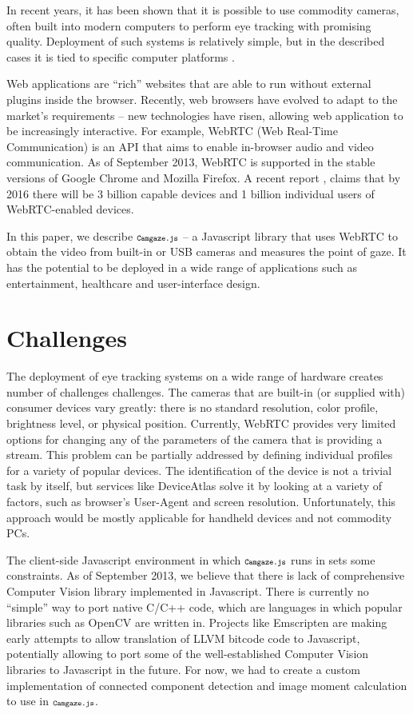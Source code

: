 \documentclass[annual]{acmsiggraph}
\newcommand{\Acronym}[1]{\ensuremath{{\small{\texttt{#1}}}}}
\newcommand{\Name}{\Acronym{Camgaze.js}} \newcommand{\False}{\Constant{false}}
\newcommand{\Constant}[1]{\ensuremath{\small{\texttt{#1}}}}
\begin{document}
In recent years, it has been shown \cite{SanAgustin2009}\cite{Sewell2010}
that it is possible to use commodity cameras, often built into modern
computers to perform eye tracking with promising quality. Deployment of such
systems is relatively simple, but in the described cases it is tied to specific
computer platforms \cite{holland2012eye}.

Web applications are “rich” websites that are able to run without external
plugins inside the browser. Recently, web browsers have evolved to adapt to
the market’s requirements -- new technologies have risen, allowing web
application to be increasingly interactive. For example, WebRTC (Web Real-Time
Communication) is an API that aims to enable in-browser audio and video
communication. As of September 2013, WebRTC is supported in the stable versions
of Google Chrome and Mozilla Firefox. A recent report
\cite{DisruptiveAnalysis2013}, claims that by 2016 there will be
3 billion capable devices and 1 billion individual users of WebRTC-enabled
devices.

In this paper, we describe $\Name$ -- a Javascript library that uses WebRTC to obtain the video 
from built-in or USB cameras and measures the point of gaze. It has the potential to be deployed 
in a wide range of applications such as entertainment, healthcare and user-interface design. 



\section{Challenges}

The deployment of eye tracking systems on a wide range of hardware creates
number of challenges challenges.  The cameras that are built-in (or supplied
with) consumer devices vary greatly: there is no standard resolution, color
profile, brightness level, or physical position. Currently, WebRTC provides
very limited options for changing any of the parameters of the camera that is
providing a stream. This problem can be partially addressed by defining
individual profiles for a variety of popular devices. The identification of the
device is not a trivial task by itself, but services like DeviceAtlas
\cite{DeviceAtlas2013} solve it by looking at a variety of factors, such as
browser’s User-Agent and screen resolution.  Unfortunately, this approach would
be mostly applicable for handheld devices and not commodity PCs.

The client-side Javascript environment in which $\Name$ runs in sets some
constraints. As of September 2013, we believe that there is lack of
comprehensive Computer Vision library implemented in Javascript. There is
currently no “simple” way to port native C/C++ code, which are languages in
which popular libraries such as OpenCV are written in. Projects like Emscripten
are making early attempts to allow translation of LLVM bitcode code to
Javascript, potentially allowing to port some of the well-established Computer
Vision libraries to Javascript in the future. For now, we had to create a
custom implementation of connected component detection and image moment
calculation to use in $\Name$.
\end{document}
